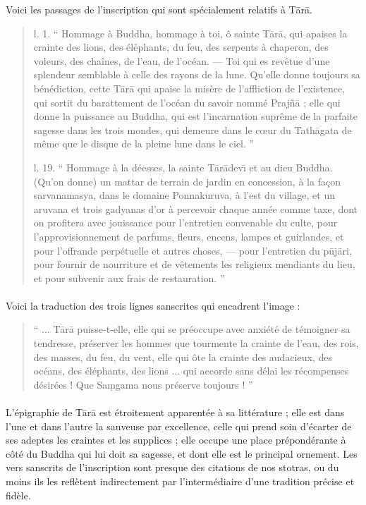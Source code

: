 \documentclass[a4paper, 11pt, oneside, french]{article}
\begin{document}
Voici les passages de l'inscription qui sont spécialement relatifs à T\={a}r\={a}.
\begin{quotation}
l. 1. `` Hommage à Buddha, hommage à toi, ô sainte T\={a}r\={a}, qui apaises la crainte des lions, des éléphants, du feu, des serpents à chaperon, des voleurs, des chaînes, de l'eau, de l'océan. --- Toi qui es revêtue d'une splendeur semblable à celle des rayons de la lune. Qu'elle donne toujours sa bénédiction, cette T\={a}r\={a} qui apaise la misère de l'affliction de l'existence, qui sortit du barattement de l'océan du savoir nommé Praj\~{n}\={a} ; elle qui donne la puissance au Buddha, qui est l'incarnation suprême de la parfaite sagesse dans les trois mondes, qui demeure dans le cœur du Tath\={a}gata de même que le disque de la pleine lune dans le ciel. ''

\bigskip

l. 19. `` Hommage à la déesses, la sainte T\={a}r\={a}dev\={\i} et au dieu Buddha. (Qu'on donne) un mattar de terrain de jardin en concession, à la façon sarvanamasya, dans le domaine Ponnakuruva, à l'est du village, et un aruvana et trois gadyanas d'or à percevoir chaque année comme taxe, dont on profitera avec jouissance pour l'entretien convenable du culte, pour l'approvisionnement de parfums, fleurs, encens, lampes et guirlandes, et pour l'offrande perpétuelle et autres choses, --- pour l'entretien du p\={u}j\={a}ri, pour fournir de nourriture et de vêtements les religieux mendiants du lieu, et pour subvenir aux frais de restauration. ''
\end{quotation}
\paragraph{}
Voici la traduction des trois lignes sanscrites qui encadrent l'image :
\begin{quotation}
`` ... T\={a}r\={a} puisse-t-elle, elle qui se préoccupe avec anxiété de témoigner sa tendresse, préserver les hommes que tourmente la crainte de l'eau, des rois, des masses, du feu, du vent, elle qui ôte la crainte des audacieux, des océans, des éléphants, des lions ... qui accorde sans délai les récompenses désirées ! Que Sa\d{m}gama nous préserve toujours ! ''
\end{quotation}
\paragraph{}
L'épigraphie de T\={a}r\={a} est étroitement apparentée à sa littérature ; elle est dans l'une et dans l'autre la sauveuse par excellence, celle qui prend soin d'écarter de ses adeptes les craintes et les supplices ; elle occupe une place prépondérante à côté du Buddha qui lui doit sa sagesse, et dont elle est le principal ornement. Les vers sanscrits de l'inscription sont presque des citations de nos stotras, ou du moins ils les reflètent indirectement par l'intermédiaire d'une tradition précise et fidèle.
\end{document}
